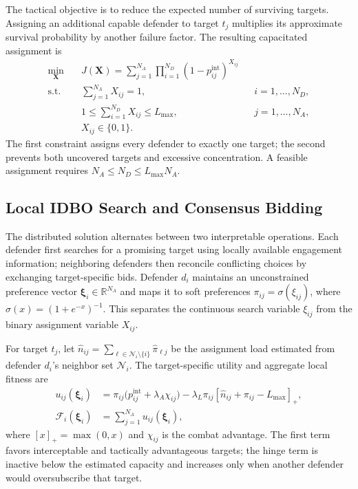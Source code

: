 \documentclass[lettersize,journal]{IEEEtran}
\begin{document}
The tactical objective is to reduce the expected number of surviving targets. Assigning an
additional capable defender to target $t_j$ multiplies its approximate survival probability
by another failure factor. The resulting capacitated assignment is
\begin{equation}
\label{eq:optimization_formulation}
\begin{aligned}
\min_{\mathbf X}\quad
&J(\mathbf X)=\sum_{j=1}^{N_A}\prod_{i=1}^{N_D}
       \left(1-p_{ij}^{\mathrm{int}}\right)^{X_{ij}}\\
\mathrm{s.t.}\quad
&\sum_{j=1}^{N_A}X_{ij}=1, && i=1,\ldots,N_D,\\
&1\leq\sum_{i=1}^{N_D}X_{ij}\leq L_{\max},
&&j=1,\ldots,N_A,\\
&X_{ij}\in\{0,1\}.&&
\end{aligned}
\end{equation}
The first constraint assigns every defender to exactly one target; the second prevents both
uncovered targets and excessive concentration. A feasible assignment requires
$N_A\leq N_D\leq L_{\max}N_A$.

\subsection{Local IDBO Search and Consensus Bidding}
\label{subsec:idbo_algorithm}

The distributed solution alternates between two interpretable operations. Each defender first
searches for a promising target using locally available engagement information; neighboring
defenders then reconcile conflicting choices by exchanging target-specific bids. Defender
$d_i$ maintains an unconstrained preference vector
$\boldsymbol{\xi}_i\in\mathbb{R}^{N_A}$ and maps it to soft preferences
$\pi_{ij}=\sigma(\xi_{ij})$, where $\sigma(x)=(1+e^{-x})^{-1}$. This separates the
continuous search variable $\xi_{ij}$ from the binary assignment variable $X_{ij}$.

For target $t_j$, let $\widehat n_{ij}=\sum_{\ell\in\mathcal N_i\setminus\{i\}}
\widehat\pi_{\ell j}$ be the assignment load estimated from defender $d_i$'s neighbor set
$\mathcal N_i$. The target-specific utility and aggregate local fitness are
\begin{equation}
\label{eq:local_utility}
\begin{aligned}
u_{ij}(\boldsymbol\xi_i)
 &=\pi_{ij}\bigl(p_{ij}^{\mathrm{int}}+\lambda_A\chi_{ij}\bigr)
 -\lambda_L\pi_{ij}
   \left[\widehat n_{ij}+\pi_{ij}-L_{\max}\right]_{+},\\
\mathcal F_i(\boldsymbol\xi_i)&=\sum_{j=1}^{N_A}u_{ij}(\boldsymbol\xi_i),
\end{aligned}
\end{equation}
where $[x]_{+}=\max(0,x)$ and $\chi_{ij}$ is the combat advantage. The first term favors
interceptable and tactically advantageous targets; the hinge term is inactive below the
estimated capacity and increases only when another defender would oversubscribe that target.
\end{document}
